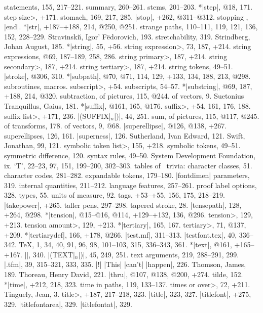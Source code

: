 statements, 155, 217--221.
\sub summary, 260--261.
stems, 201--203.
*|step|, @18, 171.
\<step size>, +171.
stomach, 169, 217, 285.
|stop|, +262, @311--@312.
stopping \MF, \see |end|.
*|str|, +187--+188, 214, @250, @251.
strange paths, 110--111, 119, 121, 136, 152, 228--229.
Stravinski{\u\i}, Igor' F\"edorovich, 193.
stretchability, 319.
Strindberg, Johan August, 185.
*|string|, 55, +56.
\<string expression>, 73, 187, +214.
string expressions, @69, 187--189, 258, 286.
\<string primary>, 187, +214.
\<string secondary>, 187, +214.
\<string tertiary>, 187, +214.
string tokens, 49--51.
|stroke|, @306, 310.
*|subpath|, @70, @71, 114, 129, +133, 134, 188, 213, @298.
subroutines, \see macros.
\<subscript>, +54.
subscripts, 54--57.
*|substring|, @69, 187, +188, 214, @320.
subtraction, of pictures, 115, @244.
\sub of vectors, 9.
Suetonius Tranquillus, Gaius, 181.
*|suffix|, @161, 165, @176.
\<suffix>, +54, 161, 176, 188.
\<suffix list>, +171, 236.
|(SUFFIX|$_n$|)|, 44, 251.
sum, of pictures, 115, @117, @245.
\sub of transforms, 178.
\sub of vectors, 9, @68.
|superellipse|, @126, @138, +267.
superellipses, 126, 161.
|superness|, 126.
Sutherland, Ivan Edward, 121.
Swift, Jonathan, 99, 121.
\<symbolic token list>, 155, +218.
symbolic tokens, 49--51.
symmetric difference, 120.
syntax rules, 49--50.
System Development Foundation, ix.
\newletter
`T', 22--23, 97, 151, 199--200, 302--303.
tables of \MF\ trivia:
\sub character classes, 51.
\sub character codes, 281--282.
\sub expandable tokens, 179--180.
\sub |fontdimen| parameters, 319.
\sub internal quantities, 211--212.
\sub language features, 257--261.
\sub proof\/ label options, 328.
\sub types, 55.
\sub units of measure, 92.
tags, +53--+55, 156, 175, 218--219.
|takepower|, +265.
taller pens, 297--298.
tapered stroke, 28.
|tensepath|, 128, +264, @298.
*|tension|, @15--@16, @114, +129--+132, 136, @296.
\<tension>, 129, +213.
\<tension amount>, 129, +213.
*|tertiary|, 165, 167.
\<tertiary>, 71, @137, +209.
*|tertiarydef|, 166, +178, @266.
|test.mf|, 311--313.
|testfont.tex|, 40, 336--342.
\TeX, 1, 34, 40, 91, 96, 98, 101--103, 315, 336--343, 361.
*|text|, @161, +165--+167.
|\text|, 340.
|(TEXT|$_n$|)|, 45, 249, 251.
text arguments, 219, 288--291, 299.
|.tfm|, 39, 315--321, 333, 335.
|!| |This| |can't| |happen|, 226.
Thomson, James, 189.
Thoreau, Henry David, 221.
|thru|, @107, @138, @200, +274.
tilde, 152.
*|time|, +212, 218, 323.
time in paths, 119, 133--137.
\<times or over>, 72, +211.
Tinguely, Jean, 3.
\<title>, +187, 217--218, 323.
|title|, 323, 327.
|titlefont|, +275, 329.
|titlefontarea|, 329.
|titlefontat|, 329.

